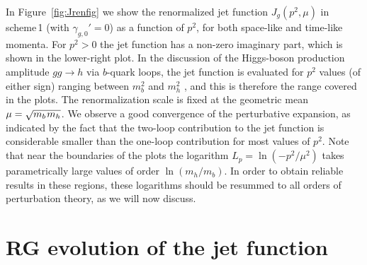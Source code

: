 \documentclass[12pt]{article}
\newcommand{\spac}{{\hspace{0.3mm}}}
\numberwithin{equation}{section}
\begin{document}
In Figure~\ref{fig:Jrenfig} we show the renormalized jet function $J_g(p^2,\mu)$ in scheme\,1 (with $\gamma_{g,0}'=0$) as a function of $p^2$, for both space-like and time-like momenta. For $p^2>0$ the jet function has a non-zero imaginary part, which is shown in the lower-right plot. In the discussion of the Higgs-boson production amplitude $gg\to h$ via $b$-quark loops, the jet function is evaluated for $p^2$ values (of either sign) ranging between $m_b^2$ and $m_h^2$ \cite{HiggsGluGlu}, and this is therefore the range covered in the plots. The renormalization scale is fixed at the geometric mean $\mu=\sqrt{m_b\spac m_h}$. We observe a good convergence of the perturbative expansion, as indicated by the fact that the two-loop contribution to the jet function is considerable smaller than the one-loop contribution for most values of $p^2$. Note that near the boundaries of the plots the logarithm $L_p=\ln(-p^2/\mu^2)$ takes parametrically large values of order $\ln(m_h/m_b)$. In order to obtain reliable results in these regions, these logarithms should be resummed to all orders of perturbation theory, as we will now discuss. 


\section{RG evolution of the jet function}
\end{document}
